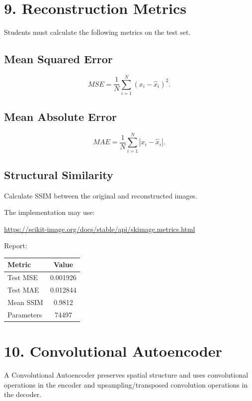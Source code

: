 \documentclass[10pt]{article}
\begin{document}
\section*{9. Reconstruction Metrics}

Students must calculate the following metrics on the test set.

\subsection*{Mean Squared Error}

\[
MSE=
\frac{1}{N}
\sum_{i=1}^{N}
(x_i-\hat{x}_i)^2.
\]

\subsection*{Mean Absolute Error}

\[
MAE=
\frac{1}{N}
\sum_{i=1}^{N}
|x_i-\hat{x}_i|.
\]

\subsection*{Structural Similarity}

Calculate SSIM between the original and reconstructed images.

The implementation may use:

\url{https://scikit-image.org/docs/stable/api/skimage.metrics.html}

Report:

\begin{center}
\begin{tabular}{|l|c|}
\hline
Metric & Value\\
\hline
Test MSE & 0.001926\\
Test MAE & 0.012844\\
Mean SSIM & 0.9812\\
Parameters & 74497\\
\hline
\end{tabular}
\end{center}

\section*{10. Convolutional Autoencoder}

A Convolutional Autoencoder preserves spatial structure and uses convolutional
operations in the encoder and upsampling/transposed convolution operations
in the decoder.
\end{document}
